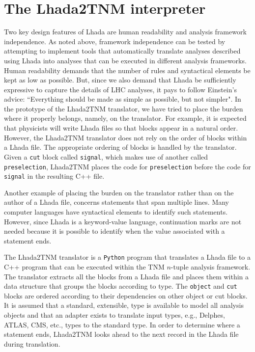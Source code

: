 \documentclass[11pt]{cernrep}
\begin{document}
\section{The {\sc Lhada2TNM} interpreter}
%

Two key design features of {\sc Lhada} are human readability and analysis framework independence. As noted above, framework independence can be tested by attempting to implement tools that automatically translate analyses described using {\sc Lhada} into analyses that can be executed in different analysis frameworks. Human readability demands that  the number of rules and syntactical elements be kept as low as possible. But, since we also demand that {\sc Lhada} be sufficiently expressive to capture the details of LHC analyses, it pays to follow Einstein's advice: ``Everything should be made as simple as possible, but not simpler".    In the prototype of the  {\sc Lhada2TNM} translator, we have tried to place the burden where it properly belongs, namely, on the translator. For example, it is expected that physicists will write {\sc Lhada} files so that blocks appear in a natural order. However, the {\sc Lhada2TNM} translator does not rely on the order of blocks within a {\sc Lhada} file. The appropriate ordering of blocks is handled by the translator. Given a {\tt cut} block called {\tt signal}, which makes use of another called {\tt preselection}, {\sc Lhada2TNM} places  the code for {\tt preselection} before the code for {\tt signal} in the resulting C++ file.

Another example of placing the burden on the translator rather than on the author of a {\sc Lhada} file, concerns statements that span multiple lines. Many computer languages have syntactical elements to identify such statements. However, since {\sc Lhada} is a keyword-value language, continuation marks are not needed because it is possible to identify when the value associated with a statement ends.

The {\sc Lhada2TNM} translator is a {\tt Python} program that translates a {\sc Lhada} file to a C++ program that can be executed within the {\sc TNM} $n$-tuple analysis framework. The translator extracts all the blocks from a {\sc Lhada} file and places them within a data structure that groups the blocks according to type. The {\tt object} and {\tt cut} blocks are ordered according to their dependencies on other object or cut blocks. It is assumed that a standard, extensible, type is available to model all analysis objects and that an adapter exists to translate input types, e.g., {\sc Delphes}, {\sc ATLAS}, {\sc CMS}, etc., types  to the standard type. In order to determine where a statement ends, {\sc Lhada2TNM} looks ahead to the next record in the {\sc Lhada} file during translation.
\end{document}
